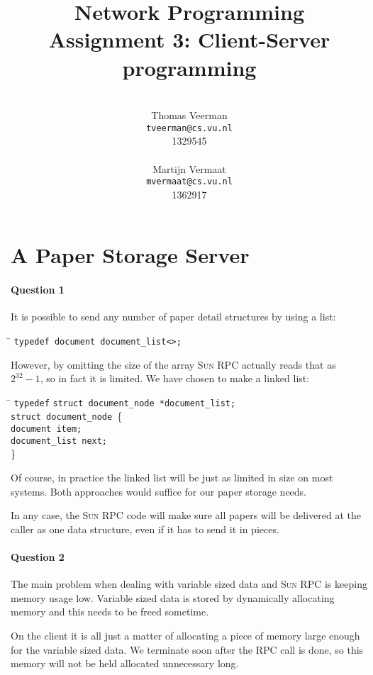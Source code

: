 \documentclass[a4paper,10pt]{article}
\title{Network Programming\\
\small{Assignment 3: Client-Server programming}}
\author{%
        \mbox{}\\
        Thomas Veerman\\
        \texttt{tveerman@cs.vu.nl}\\
        1329545\\
        \mbox{}\\
        Martijn Vermaat\\
        \texttt{mvermaat@cs.vu.nl}\\
        1362917
}
\begin{document}
\maketitle

\section{A Paper Storage Server}
\paragraph{Question 1}
It is possible to send any number of paper detail structures by using
a list:

\begin{tabbing}
\hspace{20pt}\=\kill
 \>\texttt{typedef document document\_list<>;}
\end{tabbing}

However, by omitting the size of the array \textsc{Sun RPC} actually reads that
as $2^{32} - 1$, so in fact it is limited. We have chosen to make a
linked list:

\begin{tabbing}
\hspace{20pt}\=\kill
 \> \texttt{type}\=\texttt{def} \texttt{struct document\_node *document\_list;}\\ 
 \> \texttt{struct document\_node }\{ \+ \\
 \> \texttt{document item;}\\ 
 \> \texttt{document\_list next;} \- \\
 \> \} 
\end{tabbing}

Of course, in practice the linked list will be just as limited in size
on most systems. Both approaches would suffice for our paper storage
needs.

In any case, the \textsc{Sun RPC} code will make sure all papers will be
delivered at the caller as one data structure, even if it has to send
it in pieces.

\paragraph{Question 2}
The main problem when dealing with variable sized data and \textsc{Sun RPC} is
keeping memory usage low. Variable sized data is stored by dynamically
allocating memory and this needs to be freed sometime.

On the client it is all just a matter of
allocating a piece of memory large enough for the variable sized
data. We terminate soon after the RPC call is done, so this memory
will not be held allocated unnecessary long.
\end{document}
